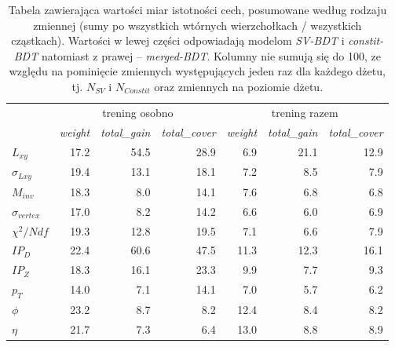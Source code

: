 \begin{table}[ht]
\centering
\begin{tabular}{l|rrr|rrr}
\toprule
{} & \multicolumn{3}{c|}{trening osobno} & \multicolumn{3}{c}{trening razem} \\
{} & \textit{weight} & \textit{total\_gain} & \textit{total\_cover} & \textit{weight} &   \textit{total\_gain} &  \textit{total\_cover} \\
\midrule
$L_{xy}$              &     17.2 &         54.5 &          28.9 &    6.9 &       21.1 &        12.9 \\
$\sigma_{Lxy}$         &     19.4 &         13.1 &          18.1 &    7.2 &        8.5 &         7.9 \\
$M_{inv}$             &     18.3 &          8.0 &          14.1 &    7.6 &        6.8 &         6.8 \\
$\sigma_{vertex}$       &     17.0 &          8.2 &          14.2 &    6.6 &        6.0 &         6.9 \\
$\chi^2/Ndf$             &     19.3 &         12.8 &          19.5 &    7.1 &        6.6 &         7.9 \\
\cmidrule{1-4}
$IP_D$ &     22.4 &         60.6 &          47.5 &   11.3 &       12.3 &        16.1 \\
$IP_Z$ &     18.3 &         16.1 &          23.3 &    9.9 &        7.7 &         9.3 \\
$p_T$               &     14.0 &          7.1 &          14.1 &    7.0 &        5.7 &         6.2 \\
$\phi$              &     23.2 &          8.7 &           8.2 &   12.4 &        8.4 &         8.2 \\
$\eta$              &     21.7 &          7.3 &           6.4 &   13.0 &        8.8 &         8.9 \\
\bottomrule
\end{tabular}
\caption{Tabela zawierająca wartości miar istotności cech, posumowane według rodzaju zmiennej (sumy po wszystkich wtórnych wierzchołkach / wszystkich cząstkach). 
Wartości w lewej części odpowiadają modelom \textit{SV-BDT} i \textit{constit-BDT} natomiast z prawej -- \textit{merged-BDT}.
Kolumny nie sumują się do 100, ze względu na pominięcie zmiennych występujących jeden raz dla każdego dżetu, tj. $N_{SV}$ i  $N_{Constit}$ oraz zmiennych na poziomie dżetu.}
\label{tab:feat_imp_by_name}
\end{table}



%





